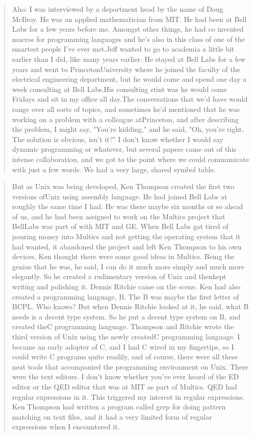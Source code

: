 \begin{quotation}
Aho: I was interviewed by a department head by the name of Doug McIlroy. He was an 
applied mathematician from MIT. He had been at Bell Labs for a few years before me. Amongst other 
things, he had co invented macros for programming languages and he's also in this class of one of the 
smartest people I've ever met.Jeff wanted to go to academia a little bit earlier than I did, like 
many years earlier. He stayed at Bell Labs for a few years and went to PrincetonUniversity where he 
joined the faculty of the electrical engineering department, but he would come and spend one day a 
week consulting at Bell Labs.His consulting stint was he would come Fridays and sit in my office 
all day.The conversations that we'd have would range over all sorts of topics, and sometimes he'd 
mentioned that he was working on a problem with a colleague atPrinceton, and after describing the 
problem, I might say, "You're kidding," and he said, "Oh, you're right. The solution is obvious, 
isn't it?" I don't know whether I would say dynamic programming or whatever, but several papers 
came out of this intense collaboration, and we got to the point where we could communicate with just 
a few words. We had a very large, shared symbol table.
\cite{aho_oral_history_2022}
\end{quotation}
\begin{quotation}
    But as Unix was being developed, Ken Thompson created the first two versions ofUnix using 
assembly language. He had joined Bell Labs at roughly the same time I had. He was there maybe six 
months or so ahead of us, and he had been assigned to work on the Multics project that BellLabs was 
part of with MIT and GE. When Bell Labs got tired of pouring money into Multics and not getting the 
operating system that it had wanted, it abandoned the project and left Ken Thompson to his 
own devices. Ken thought there were some good ideas in Multics. Being the genius that he was, he 
said, I can do it much more simply and much more elegantly. So he created a rudimentary version of 
Unix and thenkept writing and polishing it. Dennis Ritchie came on the scene. Ken had also created 
a programming language, B. The B was maybe the first letter of BCPL. Who knows? But when Dennis 
Ritchie looked at it, he said, what B needs is a decent type system. So he put a decent type system 
on B, and created theC programming language. Thompson and Ritchie wrote the third version of Unix 
using the newly createdC programming language. I became an early adopter of C, and I had C wired in 
my fingertips, so I could write C programs quite readily, and of course, there were all these neat 
tools that accompanied the programming environment on Unix. There were the text editors. I don't 
know whether you've ever heard of the ED editor or the QED editor that was at MIT as part of 
Multics. QED had regular expressions in it. This triggered my interest in regular expressions. Ken 
Thompson had written a program called grep for doing pattern matching on text files, and it had a 
very limited form of regular expressions when I encountered it.
\cite{aho_oral_history_2022}
\end{quotation}
